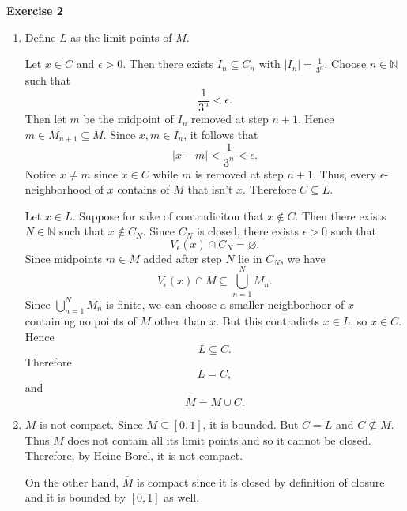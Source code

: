 \documentclass[12pt]{article}
\begin{document}
\textbf{Exercise 2}
\begin{enumerate}[label=(\alph*)]
    \item Define \( L \) as the limit points of \( M \).

          Let \( x \in C \) and \( \epsilon > 0 \). Then there exists \( I_n \subseteq C_n \) with \( \vert I_n \vert = \frac{1}{3^n} \). Choose \( n \in \mathbb{N} \) such that
          \[
              \frac{1}{3^n} < \epsilon.
          \]
          Then let \( m \) be the midpoint of \( I_n \) removed at step \( n + 1 \).
          Hence \( m \in M_{n+1} \subseteq M \). Since \( x, m \in I_n \), it follows that
          \[
              \vert x - m \vert < \frac{1}{3^n} < \epsilon.
          \]
          Notice \( x \neq m \) since \( x \in C \) while \( m \) is removed at step \( n+1 \). Thus, every \( \epsilon \)-neighborhood of \( x \) contains of \( M \) that isn't \( x \). Therefore \( C \subseteq L \).

          Let \( x \in L \).   Suppose for sake of contradiciton that \( x \not \in C \). Then there exists \( N \in \mathbb{N} \) such that \( x \not \in C_N \). Since \( C_N \) is closed, there exists \( \epsilon > 0 \) such that
          \[
              V_{\epsilon}(x) \cap C_N  = \varnothing.
          \]
          Since midpoints \( m \in M \) added after step \( N \) lie in \( C_N \), we have
          \[
              V_{\epsilon}(x) \cap M \subseteq \bigcup_{n=1}^{N} M_n.
          \]
          Since \( \bigcup_{n=1}^{N} M_n \) is finite, we can choose a smaller neighborhoor of \( x \) containing no points of \( M \) other than \( x \).
          But this contradicts \( x \in L \), so \( x \in C \). Hence
          \[
              L \subseteq C.
          \]
          Therefore
          \[
              L = C,
          \]
          and
          \[
              \overline{M} = M \cup C.
          \]


    \item \( M \) is not compact. Since \( M \subseteq [0,1] \), it is bounded. But \( C = L \) and \( C \nsubseteq M \). Thus \( M \) does not contain all its limit points and so it cannot be closed. Therefore, by Heine-Borel, it is not compact.

          On the other hand, \( \overline{M} \)  is compact since it is closed by definition of closure and it is bounded by \( [0,1] \) as well.
\end{enumerate}
\end{document}
